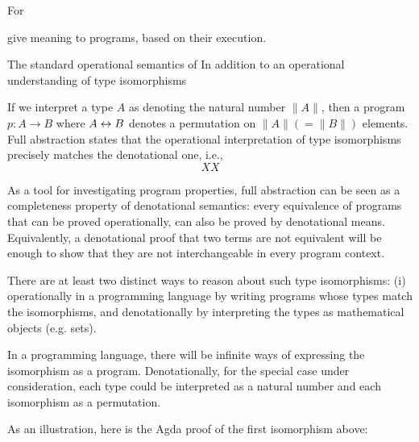 For


give meaning to programs, based on their execution.

The standard operational semantics of In addition to an operational understanding of type isomorphisms

If we interpret a type $A$ as denoting the natural number $\| A \|$, then a
program $p : A \rightarrow B$ where $A \leftrightarrow B$ denotes a permutation on
$\| A \| (= \| B \|)$ elements. Full abstraction states that the operational
interpretation of type isomorphisms precisely matches the denotational one,
i.e.,
\[
XX
\]

As a tool for investigating program properties, full abstraction can be seen as
a completeness property of denotational semantics: every equivalence of programs
that can be proved operationally, can also be proved by denotational
means. Equivalently, a denotational proof that two terms are not equivalent will
be enough to show that they are not interchangeable in every program context.

There are at least two distinct ways to reason about such type isomorphisms: (i)
operationally in a programming language by writing programs whose types match
the isomorphisms, and denotationally by interpreting the types as mathematical
objects (e.g. sets).

In a programming language, there will be infinite ways of
expressing the isomorphism as a program. Denotationally, for the special case
under consideration, each type could be interpreted as a natural number and each
isomorphism as a permutation.


As an illustration, here is the Agda proof of the first isomorphism above:




